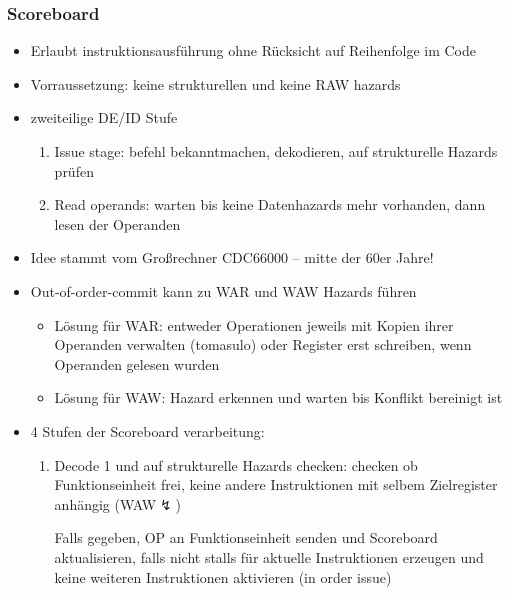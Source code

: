 \subsubsection{Scoreboard}
\label{scoreboard}
\begin{itemize}
	\item
		Erlaubt instruktionsausführung ohne Rücksicht auf Reihenfolge im Code
	\item
		Vorraussetzung: keine strukturellen und keine RAW hazards
	\item
		zweiteilige DE/ID Stufe
		\begin{enumerate}
			\item
				Issue stage: befehl bekanntmachen, dekodieren, auf strukturelle Hazards prüfen
			\item
				Read operands: warten bis keine Datenhazards mehr vorhanden, dann lesen der Operanden
		\end{enumerate}
	\item
		Idee stammt vom Großrechner CDC66000 -- mitte der 60er Jahre!
	\item
		Out-of-order-commit kann zu WAR und WAW Hazards führen
		\begin{itemize}
			\item
				Lösung für WAR: entweder Operationen jeweils mit Kopien ihrer Operanden verwalten (tomasulo) oder Register erst schreiben, wenn Operanden gelesen wurden
			\item
				Lösung für WAW: Hazard erkennen und warten bis Konflikt bereinigt ist
		\end{itemize}
	\item
		4 Stufen der Scoreboard verarbeitung:
		\begin{enumerate}
			\item
				Decode 1 und auf strukturelle Hazards checken: checken ob Funktionseinheit frei, keine andere Instruktionen mit selbem Zielregister anhängig (WAW$\lightning$)

				Falls gegeben, OP an Funktionseinheit senden und Scoreboard aktualisieren, falls nicht stalls für aktuelle Instruktionen erzeugen und keine weiteren Instruktionen aktivieren (in order issue)
				

\end{enumerate}
\end{itemize}
